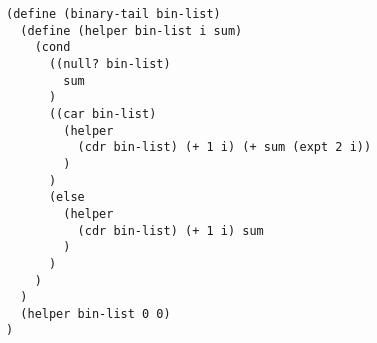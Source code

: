 \begin{solution}
\begin{blocksection}
\begin{lstlisting}
(define (binary-tail bin-list)
  (define (helper bin-list i sum)
    (cond
      ((null? bin-list)
        sum
      )
      ((car bin-list)
        (helper
          (cdr bin-list) (+ 1 i) (+ sum (expt 2 i))
        )
      )
      (else
        (helper
          (cdr bin-list) (+ 1 i) sum
        )
      )
    )
  )
  (helper bin-list 0 0)
)
\end{lstlisting}
\end{blocksection}
\end{solution}
